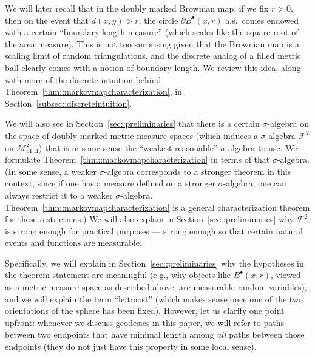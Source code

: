 \documentclass[10pt]{amsart}
\let\mathcal\mathscr
\newcommand{\sbullet}{{\scriptscriptstyle\bullet}}
\theoremstyle{plain}
\numberwithin{theorem}{section}
\theoremstyle{definition}
\newcommand\gmsspace{{\mathcal M}_{\mathrm{SPH}}}
\newcommand\mmsigma{{\mathcal F}}
\newcommand{\fb}[2]{B^\sbullet(#1,#2)}
\begin{document}
We will later recall that in the doubly marked Brownian map, if we fix $r>0$, then on the event that $d(x,y) > r$, the circle $\partial \fb{x}{r}$ a.s.\ comes endowed with a certain ``boundary length measure'' (which scales like the square root of the area measure). This is not too surprising given that the Brownian map is a scaling limit of random triangulations, and the discrete analog of a filled metric ball clearly comes with a notion of boundary length. We review this idea, along with more of the discrete intuition behind Theorem~\ref{thm::markovmapcharacterization}, in Section~\ref{subsec::discreteintuition}.

We will also see in Section~\ref{sec::preliminaries} that there is a certain $\sigma$-algebra on the space of doubly marked metric measure spaces (which induces a $\sigma$-algebra $ \mmsigma^2$ on $\gmsspace^2$) that is in some sense the ``weakest reasonable'' $\sigma$-algebra to use. We formulate Theorem~\ref{thm::markovmapcharacterization} in terms of that $\sigma$-algebra. (In some sense, a weaker $\sigma$-algebra corresponds to a stronger theorem in this context, since if one has a measure defined on a stronger $\sigma$-algebra, one can always restrict it to a weaker $\sigma$-algebra. Theorem~\ref{thm::markovmapcharacterization} is a general characterization theorem for these restrictions.) We will also explain in Section~\ref{sec::preliminaries} why $ \mmsigma^2$ is strong enough for practical purposes --- strong enough so that certain natural events and functions are measurable.

Specifically, we will explain in Section~\ref{sec::preliminaries} why the hypotheses in the theorem statement are meaningful (e.g., why objects like $\fb{x}{r}$, viewed as a metric measure space as described above, are measurable random variables), and we will explain the term ``leftmost'' (which makes sense once one of the two orientations of the sphere has been fixed). However, let us clarify one point upfront: whenever we discuss geodesics in this paper, we will refer to paths between two endpoints that have minimal length among \emph{all} paths between those endpoints (\ie they do not just have this property in some local sense).
\end{document}
